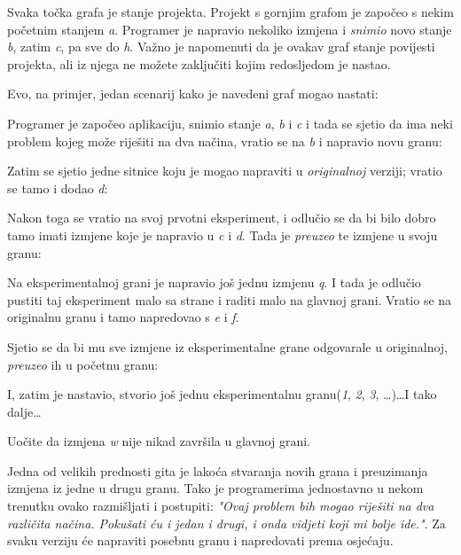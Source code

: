 

Svaka točka grafa je stanje projekta. 
Projekt s gornjim grafom je započeo s nekim početnim stanjem \emph a.
Programer je napravio nekoliko izmjena i \emph{snimio} novo stanje \emph b, zatim \emph c, pa sve do \emph h.
Važno je napomenuti da je ovakav graf stanje povijesti projekta, ali iz njega ne možete zaključiti kojim redosljedom je nastao.

Evo, na primjer, jedan scenarij kako je navedeni graf mogao nastati:



Programer je započeo aplikaciju, snimio stanje \emph a, \emph b i \emph c i tada se sjetio da ima neki problem kojeg može riješiti na dva načina, vratio se na \emph b i napravio novu granu:



Zatim se sjetio jedne sitnice koju je mogao napraviti u \emph{originalnoj} verziji; vratio se tamo i dodao \emph d:



Nakon toga se vratio na svoj prvotni eksperiment, i odlučio se da bi bilo dobro tamo imati izmjene koje je napravio u \emph c i \emph d.
Tada je \emph{preuzeo} te izmjene u svoju granu:



Na eksperimentalnoj grani je napravio još jednu izmjenu \emph q.
I tada je odlučio pustiti taj eksperiment malo sa strane i raditi malo na glavnoj grani.
Vratio se na originalnu granu i tamo napredovao s \emph e i \emph f. 



Sjetio se da bi mu sve izmjene iz eksperimentalne grane odgovarale u originalnoj, \emph{preuzeo} ih u početnu granu:



I, zatim je nastavio, stvorio još jednu eksperimentalnu granu(\emph 1, \emph 2, \emph 3, \dots)\dots I tako dalje\dots



Uočite da izmjena \emph w nije nikad završila u glavnoj grani. 

Jedna od velikih prednosti gita je lakoća stvaranja novih grana i preuzimanja izmjena iz jedne u drugu granu. 
Tako je programerima jednostavno u nekom trenutku ovako razmišljati i postupiti: \emph{"Ovaj problem bih mogao riješiti na dva različita načina. Pokušati ću i jedan i drugi, i onda vidjeti koji mi bolje ide."}. Za svaku verziju će napraviti posebnu granu i napredovati prema osjećaju.

